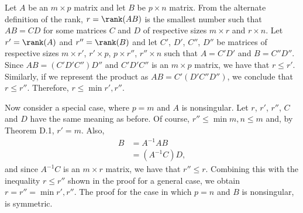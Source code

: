 Let $A$ be an $m\times p$ matrix and let $B$ be $p\times n$ matrix.
From the alternate definition of the rank, $r=\rank(AB)$ is the smallest number such that $AB=CD$ for some matrices $C$ and $D$ of respective sizes $m\times r$ and $r\times n$.
Let $r'=\rank(A)$ and $r''=\rank(B)$ and let $C'$, $D'$, $C''$, $D''$ be matrices of respective sizes $m\times r'$, $r'\times p$, $p\times r''$, $r''\times n$ such that $A=C'D'$ and $B=C''D''$.
Since $AB=(C'D'C'')D''$ and $C'D'C''$ is an $m\times p$ matrix, we have that $r\le r'$.
Similarly, if we represent the product as $AB=C'(D'C''D'')$, we conclude that $r\le r''$.
Therefore, $r\le\min{r',r''}$.

Now consider a special case, where $p=m$ and $A$ is nonsingular.
Let $r$, $r'$, $r''$, $C$ and $D$ have the same meaning as before.
Of course, $r''\le\min{m,n}\le m$ and, by Theorem D.1, $r'=m$.
Also,
\begin{align*}
    B &= A^{-1}AB \\
    &= (A^{-1}C)D,
\end{align*}
and since $A^{-1}C$ is an $m\times r$ matrix, we have that $r''\le r$.
Combining this with the inequality $r\le r''$ shown in the proof for a general case, we obtain $r=r''=\min{r',r''}$.
The proof for the case in which $p=n$ and $B$ is nonsingular, is symmetric.
